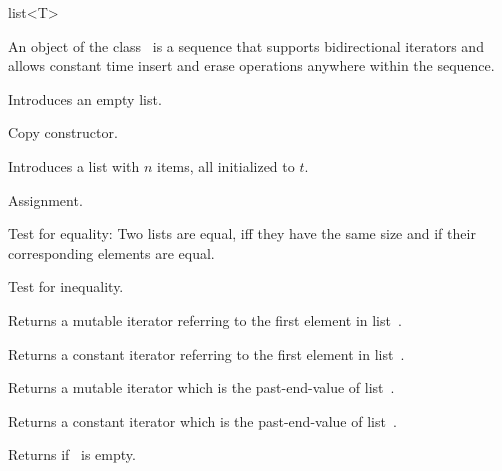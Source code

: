 
\ccHtmlNoClassLinks
\begin{ccClassTemplate} {list<T>}


\ccDefinition
An object of the class \ccClassName\ is a sequence that supports
bidirectional iterators and allows constant time insert and erase
operations anywhere within the sequence.



\ccTypes
{}

\ccCreation
{}


             {Introduces an empty list.}

 	    {Copy constructor.}

            {Introduces a list with $n$ items, all initialized to $t$.}



\ccOperations

        {Assignment.}

       {Test for equality: Two lists are equal, iff they have the same size
        and if their corresponding elements are equal.}

       {Test for inequality.}

       {Returns a mutable iterator referring to the first element in
        list~\ccVar.}

\renewcommand{\ccTagRmTrailingConst}{\ccFalse}
       {Returns a constant iterator referring to the first element in
        list~\ccVar.}
\renewcommand{\ccTagRmTrailingConst}{\ccTrue}

       {Returns a mutable iterator which is the past-end-value of
        list~\ccVar.}

\renewcommand{\ccTagRmTrailingConst}{\ccFalse}
       {Returns a constant iterator which is the past-end-value of 
        list~\ccVar.}
\renewcommand{\ccTagRmTrailingConst}{\ccTrue}

	{Returns  if \ccVar\ is empty.}


\end{ccClassTemplate}
